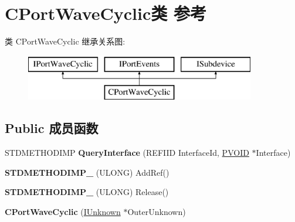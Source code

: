 \hypertarget{class_c_port_wave_cyclic}{}\section{C\+Port\+Wave\+Cyclic类 参考}
\label{class_c_port_wave_cyclic}
类 C\+Port\+Wave\+Cyclic 继承关系图\+:\begin{figure}[H]
\begin{center}
\leavevmode
\includegraphics[height=2.000000cm]{class_c_port_wave_cyclic}
\end{center}
\end{figure}
\subsection*{Public 成员函数}
\begin{DoxyCompactItemize}
\item 
\mbox{\label{class_c_port_wave_cyclic_a67ce8da026c691c7001718a78b9dc6bd}} 
S\+T\+D\+M\+E\+T\+H\+O\+D\+I\+MP {\bfseries Query\+Interface} (R\+E\+F\+I\+ID Interface\+Id, \hyperlink{interfacevoid}{P\+V\+O\+ID} $\ast$Interface)
\item 
\mbox{\label{class_c_port_wave_cyclic_a20096d5c7777a060130b326b666138f0}} 
{\bfseries S\+T\+D\+M\+E\+T\+H\+O\+D\+I\+M\+P\+\_\+} (U\+L\+O\+NG) Add\+Ref()
\item 
\mbox{\label{class_c_port_wave_cyclic_a5eab77df2dfd6c69c16440b016554653}} 
{\bfseries S\+T\+D\+M\+E\+T\+H\+O\+D\+I\+M\+P\+\_\+} (U\+L\+O\+NG) Release()
\item 
\mbox{\label{class_c_port_wave_cyclic_aaa81281e98bb9189905ab54f871ae9b4}} 
{\bfseries C\+Port\+Wave\+Cyclic} (\hyperlink{interface_i_unknown}{I\+Unknown} $\ast$Outer\+Unknown)
\end{DoxyCompactItemize}
